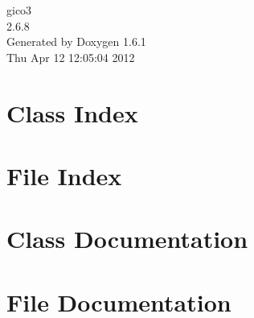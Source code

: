 \documentclass[a4paper]{book}
\begin{document}
\hypersetup{pageanchor=false}
\begin{titlepage}
\vspace*{7cm}
\begin{center}
{\Large gico3 \\[1ex]\large 2.6.8 }\\
\vspace*{1cm}
{\large Generated by Doxygen 1.6.1}\\
\vspace*{0.5cm}
{\small Thu Apr 12 12:05:04 2012}\\
\end{center}
\end{titlepage}
\clearemptydoublepage
{}
\tableofcontents
\clearemptydoublepage
{}
\hypersetup{pageanchor=true}
\chapter{Class Index}

\chapter{File Index}

\chapter{Class Documentation}














\chapter{File Documentation}




















\printindex
\end{document}
